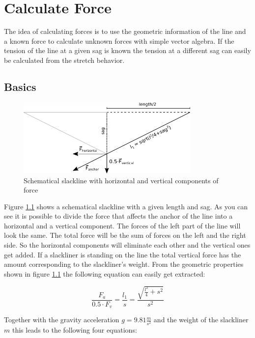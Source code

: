 \chapter{Calculate Force}

The idea of calculating forces is to use the geometric information of the line and a known force to calculate unknown forces with simple vector algebra. If the tension of the line at a given sag is known the tension at a different sag can easily be calculated from the stretch behavior.

\section{Basics} \label{sec:basics}

\begin{figure}[htb] \centering
	\includegraphics[width=0.8\textwidth]{images/slacklineWithForces.pdf}
	\caption{Schematical slackline with horizontal and vertical components of force}
	\label{fig:slacklineWithForces}
\end{figure}

Figure \ref{fig:slacklineWithForces} shows a schematical slackline with a given length and sag. As you can see it is possible to divide the force that affects the anchor of the line into a horizontal and a vertical component. The forces of the left part of the line will look the same. The total force will be the sum of forces on the left and the right side. So the horizontal components will eliminate each other and the vertical ones get added. If a slackliner is standing on the line the total vertical force has the amount corresponding to the slackliner's weight. From the geometric properties shown in figure \ref{fig:slacklineWithForces} the following equation can easily get extracted:


\begin{equation}
	\frac{F_a}{0.5\cdot F_v} = \frac{l_1}{s} = \frac{\sqrt{\frac{l^2}{4} + s^2}}{s^2}
\end{equation}

Together with the gravity acceleration $g = 9.81\frac{m}{s^2}$ and the weight of the slackliner $m$ this leads to the following four equations:

